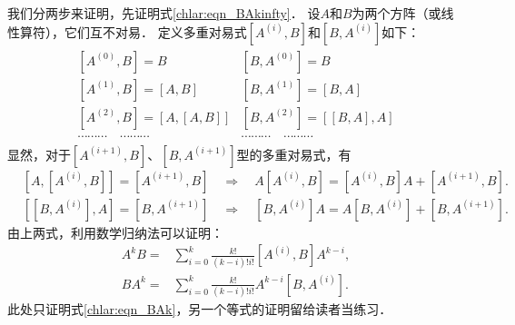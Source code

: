 我们分两步来证明，先证明式\eqref{chlar:eqn_BAkinfty}．
设$A$和$B$为两个方阵（或线性算符），它们互不对易．
定义多重对易式$\left[A^{(i)}, B\right]$和$\left[B, A^{(i)}\right]$如下：
\begin{align*}
\begin{array}{ll}
	{\left[A^{(0)}, B\right]=B} & {\left[B, A^{(0)}\right]=B} \\
	{\left[A^{(1)}, B\right]=[A, B]} & {\left[B, A^{(1)}\right]=[B, A]} \\
	{\left[A^{(2)}, B\right]=[A,[A, B]]} & {\left[B, A^{(2)}\right]=[[B, A], A]} \\
	\cdots\cdots\cdots \quad \cdots\cdots\cdots & \cdots\cdots\cdots \quad \cdots\cdots\cdots
\end{array}
\end{align*}
显然，对于$\left[A^{(i+1)}, B\right]$、$\left[B, A^{(i+1)}\right]$型的多重对易式，有
\begin{align*}
	&\left[A,\left[A^{(i)}, B\right]\right]=\left[A^{(i+1)}, B\right]
	\quad \Rightarrow \quad
	A\left[A^{(i)}, B\right]=\left[A^{(i)}, B\right] A+\left[A^{(i+1)}, B\right] . \\
	&\left[\left[B, A^{(i)}\right], A\right] = \left[B, A^{(i+1)}\right]
	\quad \Rightarrow \quad
	\left[B, A^{(i)}\right] A = A \left[B, A^{(i)}\right] + \left[B, A^{(i+1)}\right] .
\end{align*}
由上两式，利用数学归纳法可以证明：
\begin{subequations}\label{chlar:eqn_AkBAk}
\begin{align}
	A^k B= & \sum_{i=0}^k \frac{k!}{(k-i)!i!}\left[A^{(i)}, B\right] A^{k-i}, \label{chlar:eqn_AkB} \\
	B A^k= & \sum_{i=0}^k \frac{k!}{(k-i)!i!} A^{k-i}\left[B, A^{(i)}\right] . \label{chlar:eqn_BAk}
\end{align}
\end{subequations}
此处只证明式\eqref{chlar:eqn_BAk}，另一个等式的证明留给读者当练习．

